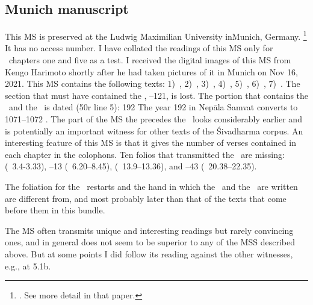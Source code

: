 \medskip
\subsection{Munich manuscript}

This MS is preserved at the Ludwig Maximilian University
in\linebreak \mbox{Munich}, Germany.%
			\footnote{. 
			See more detail in that paper.}
It has no access number.
I have collated the readings of this MS only for \VSS\ 
chapters one and five as a test. %
I received the digital images of this MS from Kengo Harimoto
shortly after he had taken pictures of it in Munich on  Nov 16, 2021. 
This MS contains the following texts:
1)~\SDhS, 
2)~\SDhU, 
3)~\Ums,
4)~\SivaUp,
5)~\Vss, 
6)~\Uums,
7)~\DharmP.
The section that must have contained the \SDhSangr, --121, is lost. 
The portion that contains the \VSS\ and the \DharmP\
is dated (\fol50r line 5):  192  The year 192 in Nepāla Samvat converts to 
1071--1072 \CE. The part of the MS the precedes the \VSS\ looks
considerably earlier and is potentially an important witness for
other texts of the Śivadharma corpus. An interesting 
feature of this MS is that it gives the number of verses contained in
each chapter in the colophons. Ten folios that transmitted the \VSS\
are missing: 
\fol5 (\VSS\ 3.4-3.33),
\fols11--13 (\VSS\ 6.20--8.45),
\fols24 (\VSS\ 13.9--13.36), and
\fols39--43 (\VSS\ 20.38--22.35). 

The foliation for the \VSS\ restarts
and the hand in which the \VSS\ and the \DharmP\ are written are different from, and
most probably later than that of the texts that come 
before them in this bundle. 

The MS often transmits unique and interesting readings
but rarely convincing ones, and in general does not seem to be superior 
to any of the MSS described above. But at some points
I did follow its reading against the other witnesses, e.g., at 5.1b.








